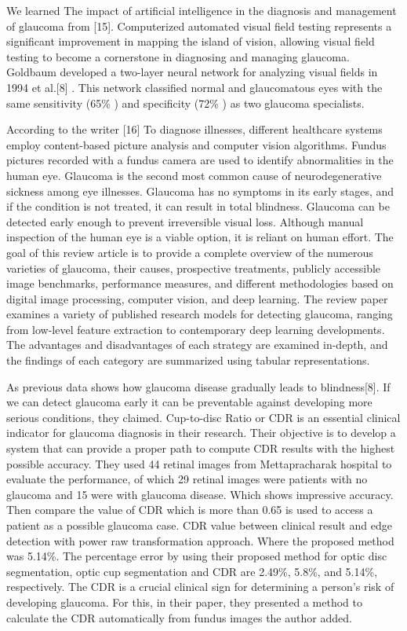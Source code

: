 \vspace{5mm}
We learned The impact of artificial intelligence in the diagnosis and management of glaucoma from [15]. Computerized automated visual field testing represents a significant improvement in mapping the island of vision, allowing visual field testing to become a cornerstone in diagnosing and managing glaucoma. Goldbaum developed a two-layer neural network for analyzing visual fields in 1994 et al.[8] . This network classified normal and glaucomatous eyes with the same sensitivity (65\% ) and specificity (72\% ) as two glaucoma specialists.

\vspace{5mm}
According to the writer [16] To diagnose illnesses, different healthcare systems employ content-based picture analysis and computer vision algorithms. Fundus pictures recorded with a fundus camera are used to identify abnormalities in the human eye. Glaucoma is the second most common cause of neurodegenerative sickness among eye illnesses. Glaucoma has no symptoms in its early stages, and if the condition is not treated, it can result in total blindness. Glaucoma can be detected early enough to prevent irreversible visual loss. Although manual inspection of the human eye is a viable option, it is reliant on human effort. The goal of this review article is to provide a complete overview of the numerous varieties of glaucoma, their causes, prospective treatments, publicly accessible image benchmarks, performance measures, and different methodologies based on digital image processing, computer vision, and deep learning. The review paper examines a variety of published research models for detecting glaucoma, ranging from low-level feature extraction to contemporary deep learning developments. The advantages and disadvantages of each strategy are examined in-depth, and the findings of each category are summarized using tabular representations.

\vspace{5mm}
As previous data shows how glaucoma disease gradually leads to blindness[8]. If we can detect glaucoma early it can be preventable against developing more serious conditions, they claimed. Cup-to-disc Ratio or CDR is an essential clinical indicator for glaucoma diagnosis in their research. Their objective is to develop a system that can provide a proper path to compute CDR results with the highest possible accuracy. They used 44 retinal images from Mettapracharak hospital to evaluate the performance, of which 29 retinal images were patients with no glaucoma and 15 were with glaucoma disease. Which shows impressive accuracy. Then compare the value of CDR which is more than 0.65 is used to access a patient as a possible glaucoma case. CDR value between clinical result and edge detection with power raw transformation approach. Where the proposed method was 5.14\%. The percentage error by using their proposed method for optic disc segmentation, optic cup segmentation and CDR are 2.49\%, 5.8\%, and 5.14\%, respectively. The CDR is a crucial clinical sign for determining a person's risk of developing glaucoma. For this, in their paper, they presented a method to calculate the CDR automatically from fundus images the author added.

